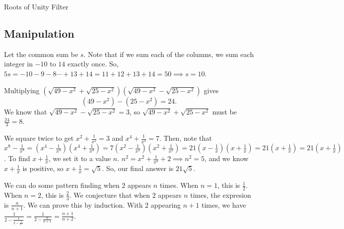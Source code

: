 \documentclass[11pt]{article}
\begin{document}
\sol Roots of Unity Filter

\subsection{Manipulation}

\sol Let the common sum be $s$. Note that if we sum each of the columns, we sum each integer in $-10$ to $14$ exactly once. So, $5s=-10-9-8\cdots +13+14=11+12+13+14=50\implies s=\boxed{10}$.


\sol Multiplying $(\sqrt{49-x^2}+\sqrt{25-x^2})(\sqrt{49-x^2}-\sqrt{25-x^2}) $ gives $$(49-x^2) - (25-x^2) = 24.$$ We know that $\sqrt{49-x^2}-\sqrt{25-x^2}=3$, so $\sqrt{49-x^2}+\sqrt{25-x^2}$ must be $\frac{24}{3} = \boxed{8}$.


\sol We square twice to get $x^2+\frac{1}{x^2}=3$ and $x^4+\frac{1}{x^4}=7$. Then, note that $x^8-\frac{1}{x^8}=(x^4-\frac{1}{x^4})(x^4+\frac{1}{x^4})=7(x^2-\frac{1}{x^2})(x^2+\frac{1}{x^2})=21(x-\frac{1}{x})(x+\frac{1}{x})=21(x+\frac{1}{x})=21(x+\frac{1}{x})$. To find $x+\frac{1}{x}$, we set it to a value $n$. $n^2 = x^2 + \frac{1}{x^2} + 2 \implies n^2 = 5$, and we know $x+\frac{1}{x}$ is positive, so $x+\frac{1}{x} = \sqrt{5}$. So, our final answer is $\boxed{21\sqrt{5}}$.


\sol We can do some pattern finding when $2$ appears $n$ times. When $n=1$, this is $\frac{1}{2}$. When $n=2$, this is $\frac{2}{3}$. We conjecture that when $2$ appears $n$ times, the expresion is $\frac{n}{n+1}$. We can prove this by induction. With $2$ appearing $n+1$ times, we have $\frac{1}{2-\frac{1}{2-\frac{1}{2\cdots}}} = \frac{1}{2-\frac{n}{n+1}}=\frac{n+1}{n+2}$.
\end{document}
